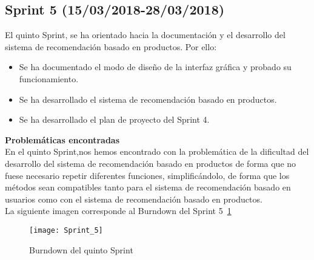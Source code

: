 \subsection{\textbf{Sprint 5} (15/03/2018-28/03/2018) }
El quinto  Sprint, se ha orientado hacia la documentación y el desarrollo del sistema de recomendación basado en productos. 
Por ello: 
\begin{itemize}
\item Se ha documentado el modo de diseño de la interfaz gráfica y probado su funcionamiento.   
\item Se ha desarrollado el sistema de recomendación basado en productos.  
\item Se ha desarrollado el plan de proyecto del Sprint 4.
 
\end{itemize}
\textbf{Problemáticas encontradas}\\En el quinto Sprint,nos hemos encontrado con la problemática de la dificultad del desarrollo del sistema de recomendación basado en productos de forma que no fuese necesario repetir diferentes funciones, simplificándolo, de forma que los métodos sean compatibles tanto  para el sistema de recomendación basado en usuarios como con el sistema de recomendación basado en productos. 
 \\La siguiente imagen corresponde al Burndown del Sprint 5~\ref{fig:A.2.5}
\begin{figure}[h]
\centering
\texttt{[image: Sprint\_5]}
\caption{Burndown del quinto Sprint}
\label{fig:A.2.5}
\end{figure}
\\

